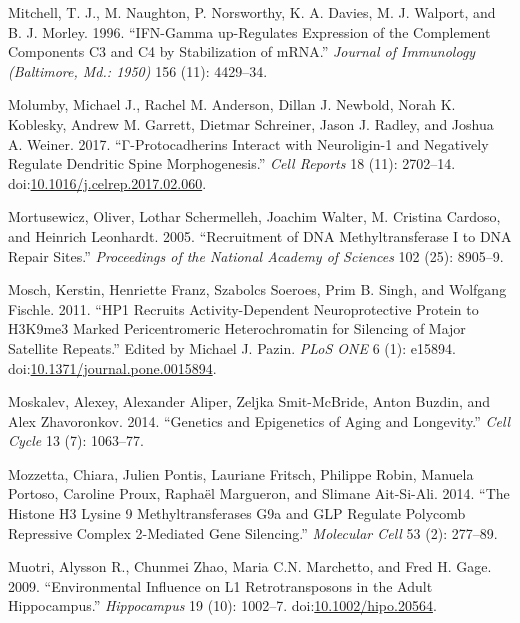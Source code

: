 \documentclass[onehalf,12pt]{beavtex}
\begin{document}
  \hypertarget{ref-MitchellIFNgammaupregulatesexpression1996}{}
  Mitchell, T. J., M. Naughton, P. Norsworthy, K. A. Davies, M. J.
  Walport, and B. J. Morley. 1996. ``IFN-Gamma up-Regulates Expression of
  the Complement Components C3 and C4 by Stabilization of mRNA.''
  \emph{Journal of Immunology (Baltimore, Md.: 1950)} 156 (11): 4429--34.
  
  \hypertarget{ref-MolumbygProtocadherinsInteractNeuroligin12017}{}
  Molumby, Michael J., Rachel M. Anderson, Dillan J. Newbold, Norah K.
  Koblesky, Andrew M. Garrett, Dietmar Schreiner, Jason J. Radley, and
  Joshua A. Weiner. 2017. ``Γ-Protocadherins Interact with Neuroligin-1
  and Negatively Regulate Dendritic Spine Morphogenesis.'' \emph{Cell
  Reports} 18 (11): 2702--14.
  doi:\href{https://doi.org/10.1016/j.celrep.2017.02.060}{10.1016/j.celrep.2017.02.060}.
  
  \hypertarget{ref-MortusewiczRecruitmentDNAmethyltransferase2005a}{}
  Mortusewicz, Oliver, Lothar Schermelleh, Joachim Walter, M. Cristina
  Cardoso, and Heinrich Leonhardt. 2005. ``Recruitment of DNA
  Methyltransferase I to DNA Repair Sites.'' \emph{Proceedings of the
  National Academy of Sciences} 102 (25): 8905--9.
  
  \hypertarget{ref-MoschHP1RecruitsActivityDependent2011}{}
  Mosch, Kerstin, Henriette Franz, Szabolcs Soeroes, Prim B. Singh, and
  Wolfgang Fischle. 2011. ``HP1 Recruits Activity-Dependent
  Neuroprotective Protein to H3K9me3 Marked Pericentromeric
  Heterochromatin for Silencing of Major Satellite Repeats.'' Edited by
  Michael J. Pazin. \emph{PLoS ONE} 6 (1): e15894.
  doi:\href{https://doi.org/10.1371/journal.pone.0015894}{10.1371/journal.pone.0015894}.
  
  \hypertarget{ref-MoskalevGeneticsepigeneticsaging2014}{}
  Moskalev, Alexey, Alexander Aliper, Zeljka Smit-McBride, Anton Buzdin,
  and Alex Zhavoronkov. 2014. ``Genetics and Epigenetics of Aging and
  Longevity.'' \emph{Cell Cycle} 13 (7): 1063--77.
  
  \hypertarget{ref-MozzettahistoneH3lysine2014}{}
  Mozzetta, Chiara, Julien Pontis, Lauriane Fritsch, Philippe Robin,
  Manuela Portoso, Caroline Proux, Raphaël Margueron, and Slimane
  Ait-Si-Ali. 2014. ``The Histone H3 Lysine 9 Methyltransferases G9a and
  GLP Regulate Polycomb Repressive Complex 2-Mediated Gene Silencing.''
  \emph{Molecular Cell} 53 (2): 277--89.
  
  \hypertarget{ref-MuotriEnvironmentalinfluenceL12009}{}
  Muotri, Alysson R., Chunmei Zhao, Maria C.N. Marchetto, and Fred H.
  Gage. 2009. ``Environmental Influence on L1 Retrotransposons in the
  Adult Hippocampus.'' \emph{Hippocampus} 19 (10): 1002--7.
  doi:\href{https://doi.org/10.1002/hipo.20564}{10.1002/hipo.20564}.
  
\end{document}
